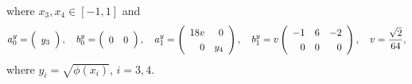 \documentclass[12pt,a4paper]{article}
\begin{document}
where $x_3, x_4 \in [-1, 1]$ and
\begin{equation*}
a_0^y = 
\left(
\begin{array}{c}
y_3
\end{array}
\right), \quad
b_0^y = 
\left(
\begin{array}{c c}
0 & 0
\end{array}
\right), \quad
a_1^y = 
\left(
\renewcommand{\arraystretch}{1.25}
\begin{array}{r r}
18v & 0 \\
0 & y_4
\end{array}
\right), \quad
b_1^y = 
v\left(
\renewcommand{\arraystretch}{1.25}
\begin{array}{r r r}
-1 & 6 & -2 \\
0 & 0 & 0
\end{array}
\right), \quad v = \frac{\sqrt{2}}{64},
\end{equation*}
where $y_i = \sqrt{\phi(x_i)}$, $i = 3, 4$.
\end{document}

